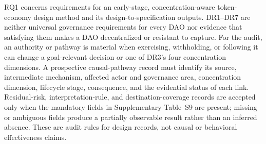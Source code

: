 \documentclass[referee,sn-basic]{sn-jnl}
\begin{document}
RQ1 concerns requirements for an early-stage, concentration-aware token-economy
design method and its design-to-specification outputs. DR1--DR7 are neither
universal governance requirements for every DAO nor evidence that satisfying
them makes a DAO decentralized or resistant to capture. For the audit, an
authority or pathway is material when exercising, withholding, or following it
can change a goal-relevant decision or one of DR3's four concentration
dimensions. A prospective causal-pathway record must identify its source,
intermediate mechanism, affected actor and governance area, concentration
dimension, lifecycle stage, consequence, and the evidential status of each
link. Residual-risk, interpretation-rule, and destination-coverage records are
accepted only when the mandatory fields in Supplementary Table~S9 are present;
missing or ambiguous fields produce a partially observable result rather than
an inferred absence. These are audit rules for design records, not causal or
behavioral effectiveness claims.
\end{document}
